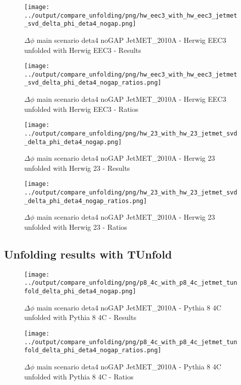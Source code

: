 \documentclass[11pt]{book}
\begin{document}
\begin{figure}[ht]
\centering
\texttt{[image: ../output/compare\_unfolding/png/hw\_eec3\_with\_hw\_eec3\_jetmet\_svd\_delta\_phi\_deta4\_nogap.png]}
\caption{$\Delta\phi$ main scenario deta4 noGAP JetMET\_2010A - Herwig EEC3 unfolded with Herwig EEC3 - Results}
\label{hw_eec3_hw_eec3_jetmet_svd_delta_phi_deta4_nogap_a}
\end{figure}

\begin{figure}[ht]
\centering
\texttt{[image: ../output/compare\_unfolding/png/hw\_eec3\_with\_hw\_eec3\_jetmet\_svd\_delta\_phi\_deta4\_nogap\_ratios.png]}
\caption{$\Delta\phi$ main scenario deta4 noGAP JetMET\_2010A - Herwig EEC3 unfolded with Herwig EEC3 - Ratios}
\label{hw_eec3_hw_eec3_jetmet_svd_delta_phi_deta4_nogap_b}
\end{figure}

\begin{figure}[ht]
\centering
\texttt{[image: ../output/compare\_unfolding/png/hw\_23\_with\_hw\_23\_jetmet\_svd\_delta\_phi\_deta4\_nogap.png]}
\caption{$\Delta\phi$ main scenario deta4 noGAP JetMET\_2010A - Herwig 23 unfolded with Herwig 23 - Results}
\label{hw_23_hw_23_jetmet_svd_delta_phi_deta4_nogap_a}
\end{figure}

\begin{figure}[ht]
\centering
\texttt{[image: ../output/compare\_unfolding/png/hw\_23\_with\_hw\_23\_jetmet\_svd\_delta\_phi\_deta4\_nogap\_ratios.png]}
\caption{$\Delta\phi$ main scenario deta4 noGAP JetMET\_2010A - Herwig 23 unfolded with Herwig 23 - Ratios}
\label{hw_23_hw_23_jetmet_svd_delta_phi_deta4_nogap_b}
\end{figure}


\clearpage
\subsection{Unfolding results with TUnfold}

\begin{figure}[ht]
\centering
\texttt{[image: ../output/compare\_unfolding/png/p8\_4c\_with\_p8\_4c\_jetmet\_tunfold\_delta\_phi\_deta4\_nogap.png]}
\caption{$\Delta\phi$ main scenario deta4 noGAP JetMET\_2010A - Pythia 8 4C unfolded with Pythia 8 4C - Results}
\label{p8_p8_jetmet_tunfold_delta_phi_deta4_nogap_a}
\end{figure}

\begin{figure}[ht]
\centering
\texttt{[image: ../output/compare\_unfolding/png/p8\_4c\_with\_p8\_4c\_jetmet\_tunfold\_delta\_phi\_deta4\_nogap\_ratios.png]}
\caption{$\Delta\phi$ main scenario deta4 noGAP JetMET\_2010A - Pythia 8 4C unfolded with Pythia 8 4C - Ratios}
\label{p8_p8_jetmet_tunfold_delta_phi_deta4_nogap_b}
\end{figure}
\end{document}
